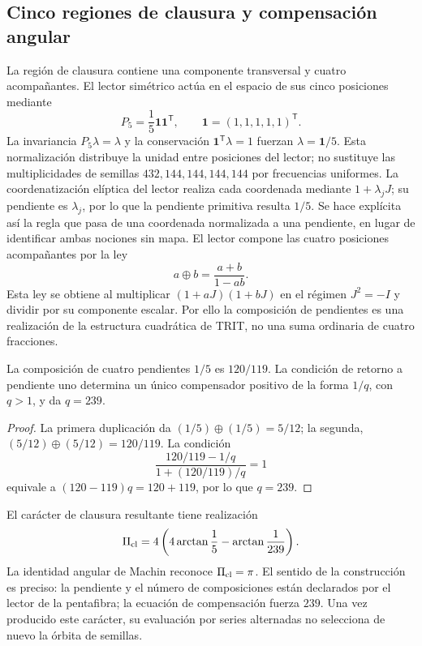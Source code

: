 \subsection{Cinco regiones de clausura y compensación angular}

La región de clausura contiene una componente transversal y cuatro acompañantes. El lector simétrico actúa en el espacio de sus cinco posiciones mediante
\[
 P_5=\frac15\mathbf1\mathbf1^{\mathsf T},\qquad
 \mathbf1=(1,1,1,1,1)^{\mathsf T}.
\]
La invariancia \(P_5\lambda=\lambda\) y la conservación \(\mathbf1^{\mathsf T}\lambda=1\) fuerzan \(\lambda=\mathbf1/5\). Esta normalización distribuye la unidad entre posiciones del lector; no sustituye las multiplicidades de semillas \(432,144,144,144,144\) por frecuencias uniformes. La coordenatización elíptica del lector realiza cada coordenada mediante \(1+\lambda_jJ\); su pendiente es \(\lambda_j\), por lo que la pendiente primitiva resulta \(1/5\). Se hace explícita así la regla que pasa de una coordenada normalizada a una pendiente, en lugar de identificar ambas nociones sin mapa. El lector compone las cuatro posiciones acompañantes por la ley
\begin{equation}
 a\oplus b=\frac{a+b}{1-ab}.
 \label{eq:suma-pendientes}
\end{equation}
Esta ley se obtiene al multiplicar \((1+aJ)(1+bJ)\) en el régimen \(J^2=-I\) y dividir por su componente escalar. Por ello la composición de pendientes es una realización de la estructura cuadrática de TRIT, no una suma ordinaria de cuatro fracciones.

\begin{proposition}
La composición de cuatro pendientes \(1/5\) es \(120/119\). La condición de retorno a pendiente uno determina un único compensador positivo de la forma \(1/q\), con \(q>1\), y da \(q=239\).
\end{proposition}
\begin{proof}
La primera duplicación da \((1/5)\oplus(1/5)=5/12\); la segunda, \((5/12)\oplus(5/12)=120/119\). La condición
\[
 \frac{120/119-1/q}{1+(120/119)/q}=1
\]
equivale a \((120-119)q=120+119\), por lo que \(q=239\).
\end{proof}

El carácter de clausura resultante tiene realización
\begin{equation}
 \Pi_{\rm cl}=4\left(4\arctan\frac15-\arctan\frac1{239}\right).
 \label{eq:lector-pi}
\end{equation}
La identidad angular de Machin reconoce \(\Pi_{\rm cl}=\pi\). El sentido de la construcción es preciso: la pendiente y el número de composiciones están declarados por el lector de la pentafibra; la ecuación de compensación fuerza \(239\). Una vez producido este carácter, su evaluación por series alternadas no selecciona de nuevo la órbita de semillas.

